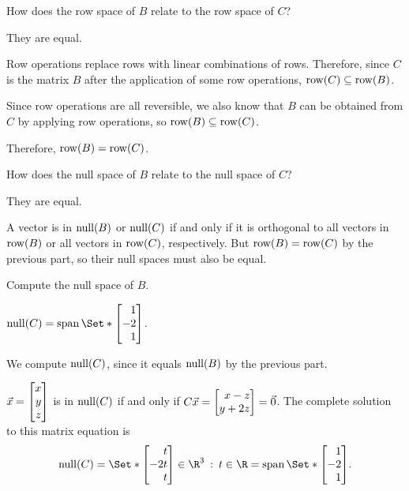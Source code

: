 	\begin{parts}
		\item How does the row space of $B$ relate to the row space of $C$?
			\begin{solution}
				They are equal.

				Row operations replace rows with linear combinations of rows.
				Therefore, since $C$ is the matrix $B$ after the application of
				some row operations, $\operatorname{row}(C)\subseteq\operatorname{row}(B)$.

				Since row operations are all reversible, we also know that $B$
				can be obtained from $C$ by applying row operations, so
				$\operatorname{row}(B)\subseteq\operatorname{row}(C)$.

				Therefore, $\operatorname{row}(B)=\operatorname{row}(C)$.
			\end{solution}
		\item How does the null space of $B$ relate to the null space of $C$?
			\begin{solution}
				They are equal.

				A vector is in $\operatorname{null}(B)$ or $\operatorname{null}(C)$ if and only if it is
				orthogonal to all vectors in $\operatorname{row}(B)$ or all vectors in $\operatorname{row}(C)$,
				respectively. But $\operatorname{row}(B)=\operatorname{row}(C)$ by the previous part, so
				their null spaces must also be equal.
			\end{solution}
		\item Compute the null space of $B$.
			\begin{solution}
				$\Null(C)=\Span\Set*{\mat{1\\-2\\1}}$.

				We compute $\operatorname{null}(C)$, since it equals $\operatorname{null}(B)$ by the previous part.

				$\vec x=\mat{x\\y\\z}$ is in $\operatorname{null}(C)$ if and only if
				$C\vec x = \mat{x-z\\y+2z} = \vec 0$. The complete solution to this matrix equation is
				\[
					\Null(C)=
					\Set*{\mat{t\\-2{t}\\t}\in\R^3 \given t\in\R}
					=\Span\Set*{\mat{1\\-2\\1}}.
				\]
			\end{solution}
	\end{parts}

